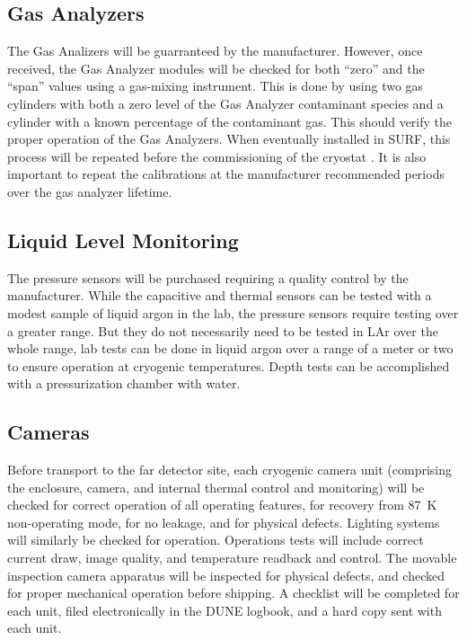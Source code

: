 \subsection{Gas Analyzers}
\label{sec:fdgen-slow-cryo-qc-ga}

The Gas Analizers will be guarranteed by the manufacturer. However, once received, the Gas Analyzer modules will be checked for both ``zero'' and the ``span'' values using a gas-mixing instrument. This is done by using two gas cylinders with both a zero level of the Gas Analyzer contaminant species and a cylinder with a known percentage of the contaminant gas. This should verify the proper operation of the Gas Analyzers. When eventually installed in SURF, this process will be repeated before the commissioning of the cryostat . It is also important to repeat the calibrations at the manufacturer recommended periods over the gas analyzer lifetime.
 

\subsection{Liquid Level Monitoring}
\label{sec:fdgen-slow-cryo-qc-llm}

The pressure sensors will be purchased requiring a quality control by the manufacturer.
While the capacitive and thermal sensors can be tested with a modest sample of liquid argon in the lab,
the pressure sensors require testing over a greater range.  But they do not
necessarily need to be tested in LAr over the whole range,  lab tests
can be done in liquid argon over a range of a meter or two to ensure operation
at cryogenic temperatures.  Depth tests can be accomplished with a
pressurization chamber with water.


\subsection{Cameras}
\label{sec:fdgen-slow-cryo-qc-c}

Before transport to the far detector site, each cryogenic camera unit (comprising the enclosure, camera, and internal thermal control and monitoring) will be checked for correct operation of all operating features, for recovery from \SI{87}{K} non-operating mode, for no leakage, and for physical defects. Lighting systems will similarly be checked for operation. Operations tests will include correct current draw, image quality, and temperature readback and control. The movable inspection camera apparatus will be inspected for physical defects, and checked for proper mechanical operation before shipping. A checklist will be completed for each unit, filed electronically in the DUNE logbook, and a hard copy sent with each unit. 

